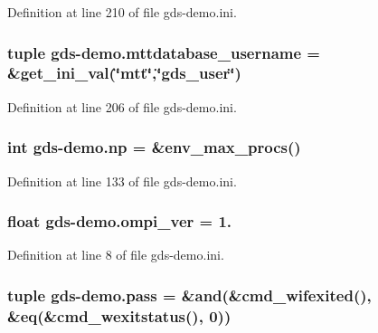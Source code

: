 Definition at line 210 of file gds-\/demo.\-ini.

\hypertarget{namespacegds-demo_a74802c727b9ae23b038625a85efa3d73}{
\subsubsection[{mttdatabase\-\_\-username}]{\setlength{\rightskip}{0pt plus 5cm}tuple gds-\/demo.\-mttdatabase\-\_\-username = \&get\-\_\-ini\-\_\-val(\char`\"{}mtt\char`\"{},\char`\"{}{\bf gds\-\_\-user}\char`\"{})}}\label{namespacegds-demo_a74802c727b9ae23b038625a85efa3d73}


Definition at line 206 of file gds-\/demo.\-ini.

\hypertarget{namespacegds-demo_a0195deda33cf9eb85895034c9b8e1088}{
\subsubsection[{np}]{\setlength{\rightskip}{0pt plus 5cm}int gds-\/demo.\-np = \&env\-\_\-max\-\_\-procs()}}\label{namespacegds-demo_a0195deda33cf9eb85895034c9b8e1088}


Definition at line 133 of file gds-\/demo.\-ini.

\hypertarget{namespacegds-demo_aa7b4ee1aa52c894100818af632edc7dc}{
\subsubsection[{ompi\-\_\-ver}]{\setlength{\rightskip}{0pt plus 5cm}float gds-\/demo.\-ompi\-\_\-ver = 1.}}\label{namespacegds-demo_aa7b4ee1aa52c894100818af632edc7dc}


Definition at line 8 of file gds-\/demo.\-ini.

\hypertarget{namespacegds-demo_a2d77898a9444a8c560ccf30fc053569e}{
\subsubsection[{pass}]{\setlength{\rightskip}{0pt plus 5cm}tuple gds-\/demo.\-pass = \&and(\&cmd\-\_\-wifexited(), \&eq(\&cmd\-\_\-wexitstatus(), 0))}}\label{namespacegds-demo_a2d77898a9444a8c560ccf30fc053569e}


